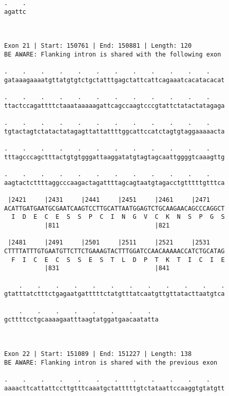 \documentclass{article}
\begin{document}
\begin{Verbatim}
.    .
agattc
      
      
 
Exon 21 | Start: 150761 | End: 150881 | Length: 120
BE AWARE: Flanking intron is shared with the following exon
 
.    .    .    .    .    .    .    .    .    .    .    .    
gataaagaaaatgttatgtgtctgctatttgagctattcattcagaaatcacatacacat
                                                            
.    .    .    .    .    .    .    .    .    .    .    .    
ttactccagattttctaaataaaaagattcagccaagtcccgtattctatactatagaga
                                                            
.    .    .    .    .    .    .    .    .    .    .    .    
tgtactagtctatactatagagttattattttggcattccatctagtgtaggaaaaacta
                                                            
.    .    .    .    .    .    .    .    .    .    .    .    
tttagcccagctttactgtgtgggattaaggatatgtagtagcaattggggtcaaagttg
                                                            
.    .    .    .    .    .    .    .    .    .    .    .    
aagtactcttttaggcccaagactagattttagcagtaatgtagacctgtttttgtttca
                                                            
 |2421     |2431     |2441     |2451     |2461     |2471    
ACATTGATGAATGCGAATCAAGTCCTTGCATTAATGGAGTCTGCAAGAACAGCCCAGGCT
  I  D  E  C  E  S  S  P  C  I  N  G  V  C  K  N  S  P  G  S
           |811                          |821               
  
 |2481     |2491     |2501     |2511     |2521     |2531    
CTTTTATTTGTGAATGTTCTTCTGAAAGTACTTTGGATCCAACAAAAACCATCTGCATAG
  F  I  C  E  C  S  S  E  S  T  L  D  P  T  K  T  I  C  I  E
           |831                          |841               
  
    .    .    .    .    .    .    .    .    .    .    .    .
gtatttatctttctgagaatgatttttctatgtttatcaatgttgttatacttaatgtca
                                                            
    .    .    .    .    .    .    .    .  
gcttttcctgcaaaagaatttaagtatggatgaacaatatta
                                          
                                          
 
Exon 22 | Start: 151089 | End: 151227 | Length: 138
BE AWARE: Flanking intron is shared with the previous exon
 
.    .    .    .    .    .    .    .    .    .    .    .    
aaaacttcattattccttgtttcaaatgctatttttgtctataattccaaggtgtatgtt
                                                            

\end{Verbatim}
\end{document}
